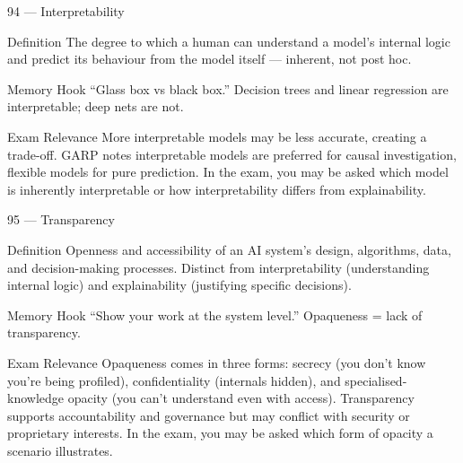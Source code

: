 \documentclass[aspectratio=169,8pt]{beamer}
\begin{document}
	\begin{frame}{94 --- Interpretability}
		\begin{block}{Definition}
			The degree to which a human can understand a model's internal logic and predict its behaviour from the model itself --- inherent, not post hoc.
		\end{block}
		\begin{block}{Memory Hook}
			``Glass box vs black box.'' Decision trees and linear regression are interpretable; deep nets are not.
		\end{block}
		\begin{block}{Exam Relevance}
			More interpretable models may be less accurate, creating a trade-off. GARP notes interpretable models are preferred for causal investigation, flexible models for pure prediction. In the exam, you may be asked which model is inherently interpretable or how interpretability differs from explainability.
		\end{block}
	\end{frame}
	
	\begin{frame}{95 --- Transparency}
		\begin{block}{Definition}
			Openness and accessibility of an AI system's design, algorithms, data, and decision-making processes. Distinct from interpretability (understanding internal logic) and explainability (justifying specific decisions).
		\end{block}
		\begin{block}{Memory Hook}
			``Show your work at the system level.'' Opaqueness = lack of transparency.
		\end{block}
		\begin{block}{Exam Relevance}
			Opaqueness comes in three forms: secrecy (you don't know you're being profiled), confidentiality (internals hidden), and specialised-knowledge opacity (you can't understand even with access). Transparency supports accountability and governance but may conflict with security or proprietary interests. In the exam, you may be asked which form of opacity a scenario illustrates.
		\end{block}
	\end{frame}
	
\end{document}
